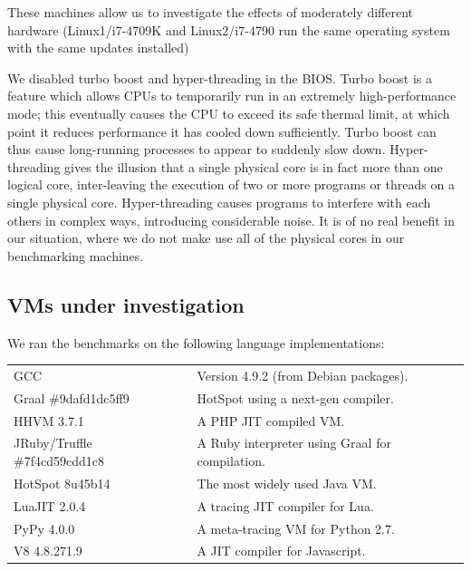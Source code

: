\documentclass[a4paper,UKenglish]{lipics}
\newcommand{\hyptwo}{H2\xspace}
\newcommand{\bencherthree}{Linux1/i7-4709K\xspace}
\newcommand{\bencherfive}{Linux2/i7-4790\xspace}
\newcommand{\benchersix}{OpenBSD/i7-4790\xspace}
\begin{document}
\noindent These machines allow us to investigate the effects of moderately different
hardware (\bencherthree and \bencherfive run the same operating system with the
same updates installed)

We disabled turbo boost and hyper-threading in the BIOS. Turbo boost is a
feature which allows CPUs to temporarily run in an extremely high-performance
mode; this eventually causes the CPU to exceed its safe thermal limit,
at which point it reduces performance it has cooled down sufficiently.
Turbo boost can thus cause long-running processes to
appear to suddenly slow down. Hyper-threading gives the illusion that a single
physical core is in fact more than one logical core, inter-leaving the
execution of two or more programs or threads on a single physical core.
Hyper-threading causes programs to interfere
with each others in complex ways, introducing considerable noise. It
is of no real benefit in our situation, where we do not make use all of the
physical cores in our benchmarking machines.


\subsection{VMs under investigation}

We ran the benchmarks on the following language implementations:

\begin{tabular}{ll}
GCC & Version 4.9.2 (from Debian packages). \\
Graal \#9dafd1dc5ff9 & HotSpot using a next-gen compiler. \\
HHVM 3.7.1 & A PHP JIT compiled VM. \\
JRuby/Truffle \#7f4cd59cdd1c8 & A Ruby interpreter using Graal for compilation. \\
HotSpot 8u45b14 & The most widely used Java VM. \\
LuaJIT 2.0.4 & A tracing JIT compiler for Lua. \\
PyPy 4.0.0 & A meta-tracing VM for Python 2.7. \\
V8 4.8.271.9 & A JIT compiler for Javascript.
\end{tabular}
%
\end{document}
